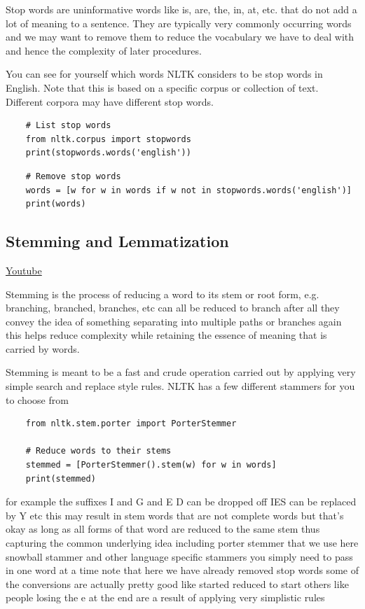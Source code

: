 Stop words are uninformative words like is, are, the, in, at, etc. that do not add a lot of meaning to a sentence. They are
typically very commonly occurring words and we may want to remove them to reduce the vocabulary we have to deal with and hence the complexity of later procedures. \newline

You can see for yourself which words NLTK considers to be stop words in English. Note that this is based on a specific corpus or collection of text. Different corpora may have different stop words.

\begin{lstlisting}
    # List stop words
    from nltk.corpus import stopwords
    print(stopwords.words('english'))
\end{lstlisting}

\begin{lstlisting}
    # Remove stop words
    words = [w for w in words if w not in stopwords.words('english')]
    print(words)
\end{lstlisting}

\subsection{Stemming and Lemmatization}
\href{https://www.youtube.com/watch?v=7Gjf81u5hmw&t=1s&ab_channel=Udacity}{Youtube}

Stemming is the process of reducing a word to its stem or root form, e.g. branching, branched, branches, etc can all be reduced to branch after all they convey the idea of something separating into multiple paths or branches again this helps reduce complexity while retaining the essence of meaning that is carried by words.

Stemming is meant to be a fast and crude operation carried out by applying very simple search and replace style rules. NLTK has a few different stammers for you to choose from

\begin{lstlisting}
    from nltk.stem.porter import PorterStemmer

    # Reduce words to their stems
    stemmed = [PorterStemmer().stem(w) for w in words]
    print(stemmed)
\end{lstlisting}



for example the suffixes I and G and E D
can be dropped off IES can be replaced
by Y etc this may result in stem words
that are not complete words but that's
okay as long as all forms of that word
are reduced to the same stem thus
capturing the common underlying idea including porter
stemmer that we use here
snowball stammer and other language
specific stammers you simply need to
pass in one word at a time
note that here we have already removed
stop words some of the conversions are
actually pretty good like started
reduced to start others like people
losing the e at the end are a result of
applying very simplistic rules 

